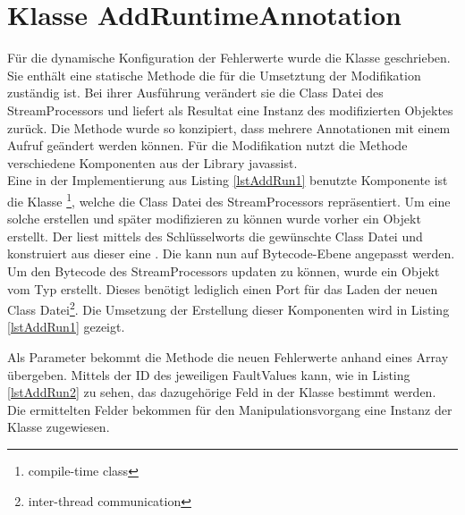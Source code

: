 \section{Klasse AddRuntimeAnnotation}

Für die dynamische Konfiguration der Fehlerwerte wurde die Klasse  geschrieben. Sie enthält eine statische Methode  die für die Umsetztung der Modifikation zuständig ist. Bei ihrer Ausführung ver\"andert sie die Class Datei des StreamProcessors und liefert als Resultat eine Instanz des modifizierten Objektes zurück. Die Methode wurde so konzipiert, dass mehrere Annotationen mit einem Aufruf ge\"andert werden k\"onnen. F\"ur die Modifikation nutzt die Methode verschiedene Komponenten aus der Library javassist.\\
Eine in der Implementierung aus Listing \ref{lstAddRun1} benutzte Komponente ist die Klasse \footnote{compile-time class}, welche die Class Datei des StreamProcessors repr\"asentiert. Um eine solche  erstellen und sp\"ater modifizieren zu k\"onnen wurde vorher ein  Objekt erstellt. Der  liest mittels des Schl\"usselworts  die gew\"unschte Class Datei und konstruiert aus dieser eine . Die  kann nun auf Bytecode-Ebene angepasst werden. Um den Bytecode des StreamProcessors updaten zu können, wurde ein Objekt vom Typ  erstellt. Dieses ben\"otigt lediglich einen Port für das Laden der neuen Class Datei\footnote{inter-thread communication}. Die Umsetzung der Erstellung dieser Komponenten wird in Listing \ref{lstAddRun1} gezeigt.

\begin{figure}[!htb]
	
\end{figure}

Als Parameter bekommt die Methode  die neuen Fehlerwerte anhand eines  Array \"ubergeben. Mittels der ID des jeweiligen FaultValues kann, wie in Listing \ref{lstAddRun2} zu sehen, das dazugeh\"orige Feld in der Klasse  bestimmt werden. Die ermittelten Felder bekommen f\"ur den Manipulationsvorgang eine Instanz der Klasse  zugewiesen. 

\begin{figure}[!htb]
	
\end{figure}

